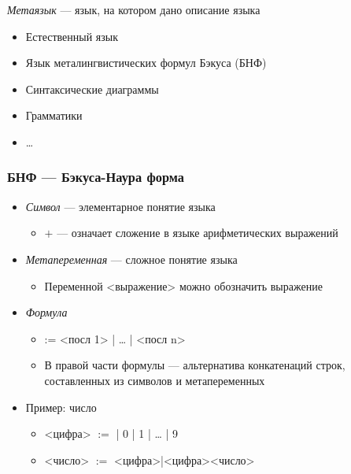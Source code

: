 \documentclass[a4paper, 14pt]{extarticle}
\begin{document}
\textit{Метаязык} --- язык, на котором дано описание языка
\begin{itemize}
    \item Естественный язык
    \item Язык металингвистических формул Бэкуса (БНФ)
    \item Синтаксические диаграммы
    \item Грамматики
    \item \ldots{}
\end{itemize}

\subsubsection{БНФ --- Бэкуса-Наура форма}
\begin{itemize}
    \item \textit{Символ} --- элементарное понятие языка
    \begin{itemize}
        \item $+$ --- означает сложение в языке арифметических выражений
    \end{itemize}
    \item \textit{Метапеременная} --- сложное понятие языка
    \begin{itemize}
        \item Переменной <выражение> можно обозначить выражение
    \end{itemize}
    \item \textit{Формула}
    \begin{itemize}
        \item <определяемый символ> := <посл 1> | \ldots{} | <посл n> %
        \item В правой части формулы --- альтернатива конкатенаций строк, составленных из символов и метапеременных
    \end{itemize}
    \item Пример: число
    \begin{itemize}
        \item <цифра> $:=$ | 0 | 1 | \ldots{} | 9
        \item <число> $:=$ <цифра>|<цифра><число>
    \end{itemize}
\end{itemize}
\end{document}
